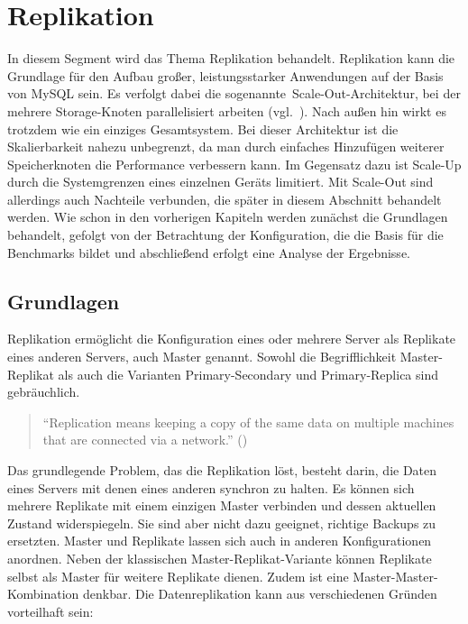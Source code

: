 
\chapter{Replikation}\label{ch:replikation}
In diesem Segment wird das Thema Replikation behandelt.
Replikation kann die Grundlage für den Aufbau großer, leistungsstarker Anwendungen auf der Basis von MySQL sein.
Es verfolgt dabei die sogenannte~\glqq Scale-Out\grqq-Architektur, bei der mehrere Storage-Knoten parallelisiert arbeiten (vgl.\ \cite[S. 531]{schwartz2012high}).
Nach außen hin wirkt es trotzdem wie ein einziges Gesamtsystem.
Bei dieser Architektur ist die Skalierbarkeit nahezu unbegrenzt, da man durch einfaches Hinzufügen weiterer Speicherknoten die Performance verbessern kann.
Im Gegensatz dazu ist Scale-Up durch die Systemgrenzen eines einzelnen Geräts limitiert.
Mit Scale-Out sind allerdings auch Nachteile verbunden, die später in diesem Abschnitt behandelt werden.
Wie schon in den vorherigen Kapiteln werden zunächst die Grundlagen behandelt, gefolgt von der Betrachtung der Konfiguration, die die Basis für die Benchmarks bildet und abschließend erfolgt eine Analyse der Ergebnisse.

\section{Grundlagen}\label{sec:replication-grundlagen}
Replikation ermöglicht die Konfiguration eines oder mehrere Server als Replikate eines anderen Servers, auch Master genannt.
Sowohl die Begrifflichkeit Master-Replikat als auch die Varianten Primary-Secondary und Primary-Replica sind gebräuchlich.

\begin{quote}
  \enquote{Replication means keeping a copy of the same data on multiple machines that are connected via a network.} (\cite[S. 151]{kleppmann2017designing})
\end{quote}

Das grundlegende Problem, das die Replikation löst, besteht darin, die Daten eines Servers mit denen eines anderen synchron zu halten.
Es können sich mehrere Replikate mit einem einzigen Master verbinden und dessen aktuellen Zustand widerspiegeln.
Sie sind aber nicht dazu geeignet, richtige Backups zu ersetzten.
Master und Replikate lassen sich auch in anderen Konfigurationen anordnen.
Neben der klassischen Master-Replikat-Variante können Replikate selbst als Master für weitere Replikate dienen.
Zudem ist eine Master-Master-Kombination denkbar.
Die Datenreplikation kann aus verschiedenen Gründen vorteilhaft sein:

